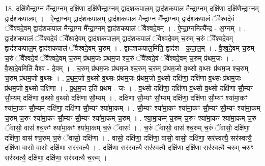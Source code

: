 \documentclass[17pt]{extarticle}
\begin{document}
18. दक्षि॑णैन्द्रा॒ग्न मै᳚न्द्रा॒ग्नम् दक्षि॑णा॒ दक्षि॑णैन्द्रा॒ग्नम् द्वाद॑शकपाल॒म् द्वाद॑शकपाल मैन्द्रा॒ग्नम् दक्षि॑णा॒ दक्षि॑णैन्द्रा॒ग्नम् द्वाद॑शकपालम् । . ऐ॒न्द्रा॒ग्नम् द्वाद॑शकपाल॒म् द्वाद॑शकपाल मैन्द्रा॒ग्न मै᳚न्द्रा॒ग्नम् द्वाद॑शकपालं ॅवैश्वदे॒वं ॅवै᳚श्वदे॒वम् द्वाद॑शकपाल मैन्द्रा॒ग्न मै᳚न्द्रा॒ग्नम् द्वाद॑शकपालं ॅवैश्वदे॒वम् । . ऐ॒न्द्रा॒ग्नमित्यै᳚न्द्र - अ॒ग्नम् । . द्वाद॑शकपालं ॅवैश्वदे॒वं ॅवै᳚श्वदे॒वम् द्वाद॑शकपाल॒म् द्वाद॑शकपालं ॅवैश्वदे॒वम् च॒रुम् च॒रुं ॅवै᳚श्वदे॒वम् द्वाद॑शकपाल॒म् द्वाद॑शकपालं ॅवैश्वदे॒वम् च॒रुम् । . द्वाद॑शकपाल॒मिति॒ द्वाद॑श - क॒पा॒ल॒म् । . वै॒श्व॒दे॒वम् च॒रुम् च॒रुं ॅवै᳚श्वदे॒वं ॅवै᳚श्वदे॒वम् च॒रुम् प्र॑थम॒जः प्र॑थम॒ज श्च॒रुं 
ॅवै᳚श्वदे॒वं ॅवै᳚श्वदे॒वम् च॒रुम् प्र॑थम॒जः । . वै॒श्व॒दे॒वमिति॑ वैश्व - दे॒वम् । . च॒रुम् प्र॑थम॒जः प्र॑थम॒ज श्च॒रुम् च॒रुम् प्र॑थम॒जो व॒थ्सो व॒थ्सः प्र॑थम॒ज श्च॒रुम् च॒रुम् प्र॑थम॒जो व॒थ्सः । . प्र॒थ॒म॒जो व॒थ्सो व॒थ्सः प्र॑थम॒जः प्र॑थम॒जो व॒थ्सो दक्षि॑णा॒ दक्षि॑णा व॒थ्सः प्र॑थम॒जः प्र॑थम॒जो व॒थ्सो दक्षि॑णा । . प्र॒थ॒म॒ज इति॑ प्रथम - जः । . व॒थ्सो दक्षि॑णा॒ दक्षि॑णा व॒थ्सो व॒थ्सो दक्षि॑णा सौ॒म्यꣳ सौ॒म्यम् दक्षि॑णा व॒थ्सो व॒थ्सो दक्षि॑णा सौ॒म्यम् । . दक्षि॑णा सौ॒म्यꣳ सौ॒म्यम् दक्षि॑णा॒ दक्षि॑णा सौ॒म्यꣳ श्या॑मा॒कꣳ श्या॑मा॒कꣳ सौ॒म्यम् दक्षि॑णा॒ दक्षि॑णा सौ॒म्यꣳ श्या॑मा॒कम् । . सौ॒म्यꣳ श्या॑मा॒कꣳ श्या॑मा॒कꣳ सौ॒म्यꣳ सौ॒म्यꣳ श्या॑मा॒कम् च॒रुम् च॒रुꣳ श्या॑मा॒कꣳ सौ॒म्यꣳ सौ॒म्यꣳ श्या॑मा॒कम् च॒रुम् । . श्या॒मा॒कम् च॒रुम् च॒रुꣳ श्या॑मा॒कꣳ श्या॑मा॒कम् च॒रुं ॅवासो॒ वास॑ श्च॒रुꣳ श्या॑मा॒कꣳ श्या॑मा॒कम् च॒रुं ॅवासः॑ । . च॒रुं ॅवासो॒ वास॑ श्च॒रुम् च॒रुं ॅवासो॒ दक्षि॑णा॒ दक्षि॑णा॒ वास॑ श्च॒रुम् च॒रुं ॅवासो॒ दक्षि॑णा । . वासो॒ दक्षि॑णा॒ दक्षि॑णा॒ वासो॒ वासो॒ दक्षि॑णा॒ सर॑स्वत्यै॒ सर॑स्वत्यै॒ दक्षि॑णा॒ वासो॒ वासो॒ दक्षि॑णा॒ सर॑स्वत्यै । . दक्षि॑णा॒ सर॑स्वत्यै॒ सर॑स्वत्यै॒ दक्षि॑णा॒ दक्षि॑णा॒ सर॑स्वत्यै च॒रुम् च॒रुꣳ सर॑स्वत्यै॒ दक्षि॑णा॒ दक्षि॑णा॒ सर॑स्वत्यै च॒रुम् । \newline
\end{document}
